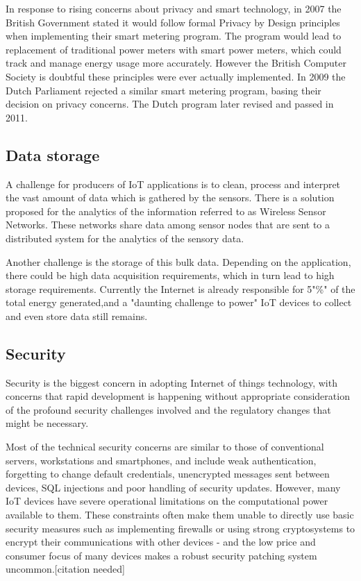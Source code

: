 \documentclass[12pt, a4paper, twoside]{article}
\begin{document}
In response to rising concerns about privacy and smart technology, in 2007 the British Government stated it would follow formal Privacy by Design principles when implementing their smart metering program. The program would lead to replacement of traditional power meters with smart power meters, which could track and manage energy usage more accurately. However the British Computer Society is doubtful these principles were ever actually implemented. In 2009 the Dutch Parliament rejected a similar smart metering program, basing their decision on privacy concerns. The Dutch program later revised and passed in 2011.

\subsection{Data storage}
A challenge for producers of IoT applications is to clean, process and interpret the vast amount of data which is gathered by the sensors. There is a solution proposed for the analytics of the information referred to as Wireless Sensor Networks. These networks share data among sensor nodes that are sent to a distributed system for the analytics of the sensory data.

Another challenge is the storage of this bulk data. Depending on the application, there could be high data acquisition requirements, which in turn lead to high storage requirements. Currently the Internet is already responsible for 5"\%" of the total energy generated,and a "daunting challenge to power" IoT devices to collect and even store data still remains.

\subsection{Security}
Security is the biggest concern in adopting Internet of things technology, with concerns that rapid development is happening without appropriate consideration of the profound security challenges involved and the regulatory changes that might be necessary.

Most of the technical security concerns are similar to those of conventional servers, workstations and smartphones, and include weak authentication, forgetting to change default credentials, unencrypted messages sent between devices, SQL injections and poor handling of security updates. However, many IoT devices have severe operational limitations on the computational power available to them.  These constraints often make them unable to directly use basic security measures such as implementing firewalls or using strong cryptosystems to encrypt their communications with other devices - and the low price and consumer focus of many devices makes a robust security patching system uncommon.[citation needed]
\end{document}
